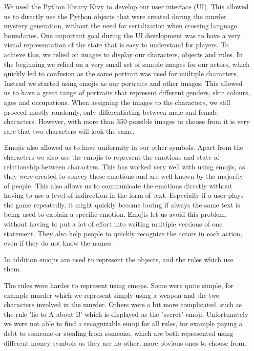 We used the Python library Kivy to develop our user interface (UI).
This allowed us to directly use the Python objects that were created during the murder mystery generation, without the need for serialization when crossing language boundaries.
One important goal during the UI development was to have a very visual representation of the state that is easy to understand for players.
To achieve this, we relied on images to display our characters, objects and rules.
In the beginning we relied on a very small set of sample images for our actors, which quickly led to confusion as the same portrait was used for multiple characters.
Instead we started using emojis as our portraits and other images.
This allowed us to have a great range of portraits that represent different genders, skin colours, ages and occupations.
When assigning the images to the characters, we still proceed mostly randomly, only differentiating between male and female characters.
However, with more than 350 possible images to choose from it is very rare that two characters will look the same.

Emojis also allowed us to have uniformity in our other symbols.
Apart from the characters we also use the emojis to represent the emotions and state of relationship between characters.
This has worked very well with using emojis, as they were created to convey these emotions and are well known by the majority of people.
This also allows us to communicate the emotions directly without having to use a level of indirection in the form of text.
Especially if a user plays the game repeatedly, it might quickly become boring if always the same text is being used to explain a specific emotion.
Emojis let us avoid this problem, without having to put a lot of effort into writing multiple versions of one statement.
They also help people to quickly recognize the actors in each action, even if they do not know the names.

In addition emojis are used to represent the objects, and the rules which use them.

The rules were harder to represent using emojis.
Some were quite simple, for example murder which we represent simply using a weapon and the two characters involved in the murder.
Others were a bit more complicated, such as the rule 'lie to A about B' which is displayed as the "secret" emoji.
Unfortunately we were not able to find a recognizable emoji for all rules, for example paying a debt to someone or stealing from someone, which are both represented using different money symbols as they are no other, more obvious ones to choose from.
